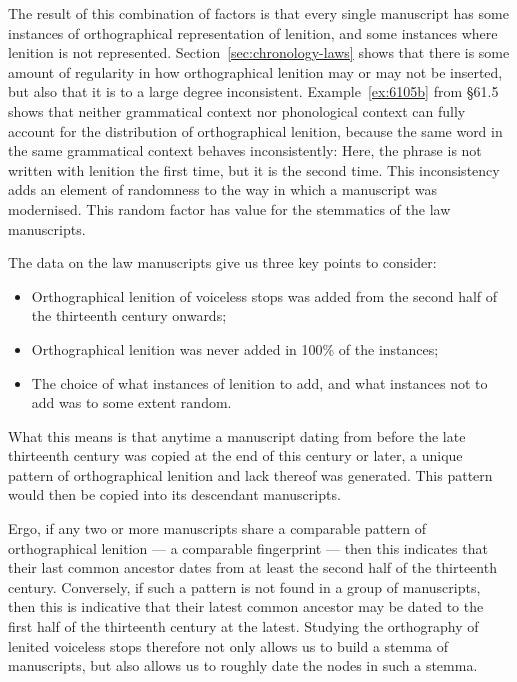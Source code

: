 The result of this combination of factors is that every single  manuscript has some instances of orthographical representation of lenition, and some instances where lenition is not represented. Section~\ref{sec:chronology-laws} shows that there is some amount of regularity in how orthographical lenition may or may not be inserted, but also that it is to a large degree inconsistent. Example~\ref{ex:6105b} from \S 61.5 shows that neither grammatical context nor phonological context can fully account for the distribution of orthographical lenition, because the same word in the same grammatical context behaves inconsistently:
Here, the phrase  is not written with lenition the first time, but it is the second time. This inconsistency adds an element of randomness to the way in which a manuscript was modernised. This random factor has value for the stemmatics of the law manuscripts. 

The data on the law manuscripts give us three key points to consider:
\begin{itemize}
\item Orthographical lenition of voiceless stops was added from the second half of the thirteenth century onwards;
\item Orthographical lenition was never added in 100\% of the instances;
\item The choice of what instances of lenition to add, and what instances not to add was to some extent random.
\end{itemize}

What this means is that anytime a manuscript dating from before the late thirteenth century was copied at the end of this century or later, a unique pattern of orthographical lenition and lack thereof was generated. This pattern would then be copied into its descendant manuscripts.

Ergo, if any two or more manuscripts share a comparable pattern of orthographical lenition --- a comparable fingerprint --- then this indicates that their last common ancestor dates from at least the second half of the thirteenth century. Conversely, if such a pattern is not found in a group of manuscripts, then this is indicative that their latest common ancestor may be dated to the first half of the thirteenth century at the latest. Studying the orthography of lenited voiceless stops therefore not only allows us to build a stemma of manuscripts, but also allows us to roughly date the nodes in such a stemma.

